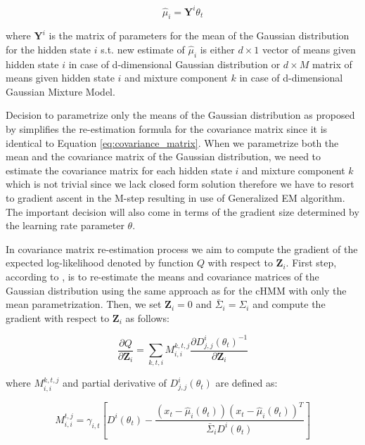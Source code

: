 \begin{equation}
    \hat{\mu}_i = \textbf{Y}^{i} \theta_t
\end{equation}

where $\textbf{Y}^{i}$ is the matrix of parameters for the mean of the Gaussian distribution for the hidden state $i$ s.t. 
new estimate of $\hat{\mu}_i$ is either $d \times 1$ vector of means given hidden state $i$ in case of d-dimensional Gaussian distribution or
$d \times M$ matrix of means given hidden state $i$ and mixture component $k$ in case of d-dimensional Gaussian Mixture Model.

Decision to parametrize only the means of the Gaussian distribution as proposed by \citep{Bobick1999} simplifies the re-estimation formula for the covariance matrix 
since it is identical to Equation \ref{eq:covariance_matrix}. When we parametrize both the mean and the covariance matrix of the Gaussian distribution,
we need to estimate the covariance matrix for each hidden state $i$ and mixture component $k$ which is not trivial since 
we lack closed form solution therefore we have to resort to gradient ascent in the M-step resulting in use of Generalized EM algorithm. 
The important decision will also come in terms of the gradient size determined by the learning rate parameter $\theta$. \citep{Radenen2014}

In covariance matrix re-estimation process we aim to compute the gradient of the expected log-likelihood denoted by function $Q$ with respect to $\textbf{Z}_i$.
First step, according to \citep{Radenen2014}, is to re-estimate the means and covariance matrices of the Gaussian distribution using the same approach as for 
the cHMM with only the mean parametrization. Then, we set $\textbf{Z}_i = 0$ and $\bar{\Sigma}_i = \Sigma_i$ and compute the gradient with respect to $\textbf{Z}_i$ as follows:

\begin{equation}
    \frac{\partial Q}{\partial \textbf{Z}_i} = \sum_{k,t,i} M_{i,i}^{k,t,j} \frac{\partial D_{j,j}^i(\theta_t)^{-1}}{\partial \textbf{Z}_i}
\end{equation}

where $M_{i,i}^{k,t,j}$ and partial derivative of $D_{j,j}^i(\theta_t)$ are defined as:

\begin{equation}
    M_{i,i}^{t,j} = \gamma_{i,t} \left[ D^i(\theta_t) - \frac{(x_t - \hat{\mu}_i(\theta_t))(x_t - \hat{\mu}_i(\theta_t))^T}{\bar{\Sigma}_i D^i(\theta_t)} \right]
\end{equation}

